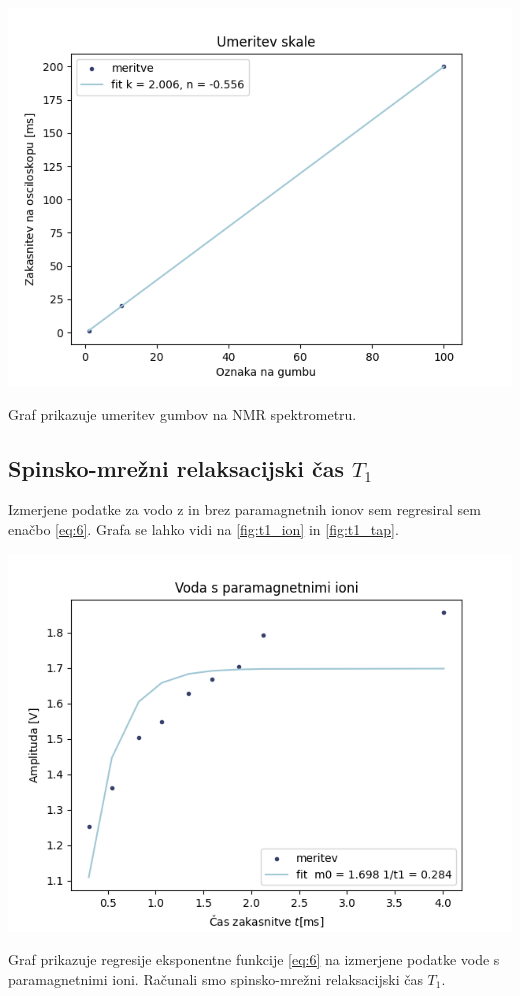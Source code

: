 \documentclass[11pt]{article}
\begin{document}
\begin{slika}[H]
\begin{center}
  \includegraphics[width=.9\linewidth]{figures/umeritev_skale.png}
  \caption{\small Graf prikazuje umeritev gumbov na NMR spektrometru. }\label{fig:umeritev}
\end{center}
\end{slika}

\subsection{Spinsko-mrežni relaksacijski čas \(T_1\)}\label{sec:org45f3957}
Izmerjene podatke za vodo z in brez paramagnetnih ionov sem regresiral sem enačbo \ref{eq:6}. Grafa se lahko vidi na \ref{fig:t1_ion} in \ref{fig:t1_tap}.

\begin{slika}[H]
\begin{center}
  \includegraphics[width=.9\linewidth]{figures/t1_ion.png}
  \caption{\small Graf prikazuje regresije eksponentne funkcije \ref{eq:6} na izmerjene podatke vode s paramagnetnimi ioni. Računali smo spinsko-mrežni relaksacijski čas \( T_{1} \).}\label{fig:t1_ion}
\end{center}
\end{slika}
\end{document}
